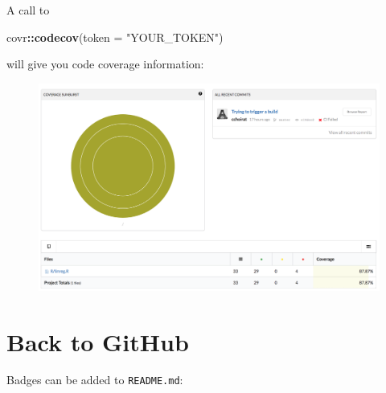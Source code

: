 \documentclass[]{book}
\newenvironment{Shaded}{\begin{snugshade}}{\end{snugshade}}
\newcommand{\KeywordTok}[1]{\textcolor[rgb]{0.13,0.29,0.53}{\textbf{#1}}}
\newcommand{\DataTypeTok}[1]{\textcolor[rgb]{0.13,0.29,0.53}{#1}}
\newcommand{\StringTok}[1]{\textcolor[rgb]{0.31,0.60,0.02}{#1}}
\newcommand{\OperatorTok}[1]{\textcolor[rgb]{0.81,0.36,0.00}{\textbf{#1}}}
\newcommand{\NormalTok}[1]{#1}
\theoremstyle{definition}
\theoremstyle{definition}
\theoremstyle{definition}
\theoremstyle{remark}
\begin{document}
A call to

\begin{Shaded}
\begin{Highlighting}[]
\NormalTok{covr}\OperatorTok{::}\KeywordTok{codecov}\NormalTok{(}\DataTypeTok{token =} \StringTok{"YOUR_TOKEN"}\NormalTok{)}
\end{Highlighting}
\end{Shaded}

will give you code coverage information:

\begin{figure}

{\centering \includegraphics{images/ch3_codecov_out} 

}

\end{figure}

\section{Back to GitHub}\label{back-to-github}

Badges can be added to \texttt{README.md}:
\end{document}
